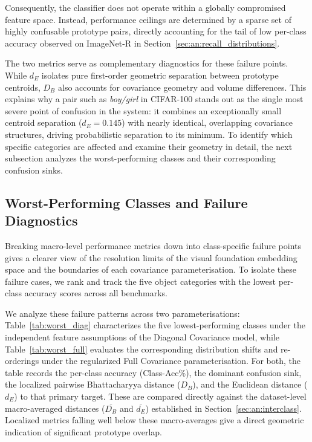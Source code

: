 Consequently, the classifier does not operate within a globally compromised feature space. Instead, performance ceilings are determined by a sparse set of highly confusable prototype pairs, directly accounting for the tail of low per-class accuracy observed on ImageNet-R in Section~\ref{sec:an:recall_distributions}.

The two metrics serve as complementary diagnostics for these failure points. While $d_E$ isolates pure first-order geometric separation between prototype centroids, $D_B$ also accounts for covariance geometry and volume differences. This explains why a pair such as \emph{boy/girl} in CIFAR-100 stands out as the single most severe point of confusion in the system: it combines an exceptionally small centroid separation ($d_E = 0.145$) with nearly identical, overlapping covariance structures, driving probabilistic separation to its minimum. To identify which specific categories are affected and examine their geometry in detail, the next subsection analyzes the worst-performing classes and their corresponding confusion sinks.

\subsection{Worst-Performing Classes and Failure Diagnostics}
\label{sec:worst_classes}

Breaking macro-level performance metrics down into class-specific failure points gives a clearer view of the resolution limits of the visual foundation embedding space and the boundaries of each covariance parameterisation. To isolate these failure cases, we rank and track the five object categories with the lowest per-class accuracy scores across all benchmarks.

We analyze these failure patterns across two parameterisations: Table~\ref{tab:worst_diag} characterizes the five lowest-performing classes under the independent feature assumptions of the Diagonal Covariance model, while Table~\ref{tab:worst_full} evaluates the corresponding distribution shifts and re-orderings under the regularized Full Covariance parameterisation. For both, the table records the per-class accuracy (Class-Acc\%), the dominant confusion sink, the localized pairwise Bhattacharyya distance ($D_B$), and the Euclidean distance ($d_E$) to that primary target. These are compared directly against the dataset-level macro-averaged distances ($\overline{D_B}$ and $\overline{d_E}$) established in Section~\ref{sec:an:interclass}. Localized metrics falling well below these macro-averages give a direct geometric indication of significant prototype overlap.

